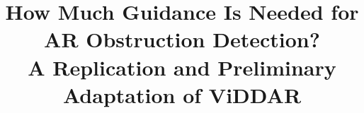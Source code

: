 \documentclass[conference]{IEEEtran}
\begin{document}

\title{How Much Guidance Is Needed for AR Obstruction Detection?\\
A Replication and Preliminary Adaptation of ViDDAR}

\author{
\and
{}
}

\maketitle


\end{document}
